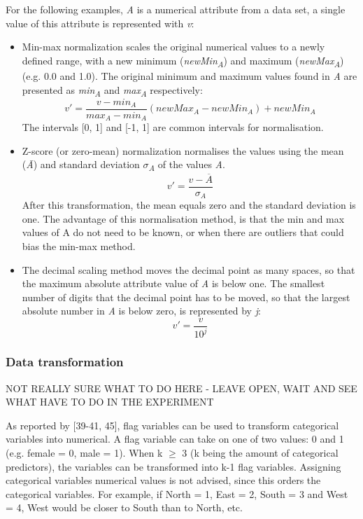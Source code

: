 For the following examples, \textit{A} is a numerical attribute from a data set, a single value of this attribute is represented with \textit{v}:
\begin{itemize}
  \item Min-max normalization scales the original numerical values to a newly defined range, with a new minimum (\textit{newMin\textsubscript{A}}) and maximum (\textit{newMax\textsubscript{A}}) (e.g. 0.0 and 1.0). The original minimum and maximum values found in \textit{A} are presented as \textit{min\textsubscript{A}} and \textit{max\textsubscript{A}} respectively:
  \[
    v' = \frac{v - min_A}{max_A - min_A}(newMax_A - newMin_A) + newMin_A
  \]
  The intervals [0, 1] and [-1, 1] are common intervals for normalisation. 

  \item Z-score (or zero-mean) normalization normalises the values using the mean (\textit{\={A}}) and standard deviation \textit{$\sigma$\textsubscript{A}} of the values \textit{A}.
  \[
    v' = \frac{v - \overline{A}}{\sigma_A}
  \]
  After this transformation, the mean equals zero and the standard deviation is one. The advantage of this normalisation method, is that the min and max values of A do not need to be known, or when there are outliers that could bias the min-max method.

  \item The decimal scaling method moves the decimal point as many spaces, so that the maximum absolute attribute value of \textit{A} is below one. The smallest number of digits that the decimal point has to be moved, so that the largest absolute number in \textit{A} is below zero, is represented by \textit{j}:
  \[
    v' = \frac{v}{10^j}
  \]
\end{itemize}



\subsubsection{Data transformation}
NOT REALLY SURE WHAT TO DO HERE - LEAVE OPEN, WAIT AND SEE WHAT HAVE TO DO IN THE EXPERIMENT

As reported by \textcite{DataMiningAndPredictiveAnalytics}[39-41, 45], flag variables can be used to transform categorical variables into numerical. A flag variable can take on one of two values: 0 and 1 (e.g. female = 0, male = 1). When k $\geq$ 3 (k being the amount of categorical predictors), the variables can be transformed into k-1 flag variables. Assigning categorical variables numerical values is not advised, since this orders the categorical variables. For example, if North = 1, East = 2, South = 3 and West = 4, West would be closer to South than to North, etc.



